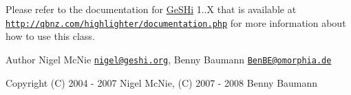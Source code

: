 Please refer to the documentation for \hyperlink{class_ge_s_hi}{Ge\-S\-Hi} 1..\-X that is available at \href{http://qbnz.com/highlighter/documentation.php}{\tt http\-://qbnz.\-com/highlighter/documentation.\-php} for more information about how to use this class.

\begin{DoxyAuthor}{Author}
Nigel Mc\-Nie \href{mailto:nigel@geshi.org}{\tt nigel@geshi.\-org}, Benny Baumann \href{mailto:BenBE@omorphia.de}{\tt Ben\-B\-E@omorphia.\-de} 
\end{DoxyAuthor}
\begin{DoxyCopyright}{Copyright}
(C) 2004 -\/ 2007 Nigel Mc\-Nie, (C) 2007 -\/ 2008 Benny Baumann 
\end{DoxyCopyright}
